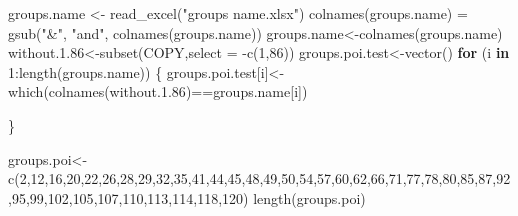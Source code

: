 \documentclass[
]{article}
\newenvironment{Shaded}{\begin{snugshade}}{\end{snugshade}}
\newcommand{\AttributeTok}[1]{\textcolor[rgb]{0.77,0.63,0.00}{#1}}
\newcommand{\ControlFlowTok}[1]{\textcolor[rgb]{0.13,0.29,0.53}{\textbf{#1}}}
\newcommand{\DecValTok}[1]{\textcolor[rgb]{0.00,0.00,0.81}{#1}}
\newcommand{\FloatTok}[1]{\textcolor[rgb]{0.00,0.00,0.81}{#1}}
\newcommand{\FunctionTok}[1]{\textcolor[rgb]{0.00,0.00,0.00}{#1}}
\newcommand{\NormalTok}[1]{#1}
\newcommand{\OtherTok}[1]{\textcolor[rgb]{0.56,0.35,0.01}{#1}}
\newcommand{\SpecialCharTok}[1]{\textcolor[rgb]{0.00,0.00,0.00}{#1}}
\newcommand{\StringTok}[1]{\textcolor[rgb]{0.31,0.60,0.02}{#1}}
\begin{document}
\begin{Shaded}
\begin{Highlighting}[]
\NormalTok{groups.name }\OtherTok{\textless{}{-}} \FunctionTok{read\_excel}\NormalTok{(}\StringTok{"groups name.xlsx"}\NormalTok{)}
\FunctionTok{colnames}\NormalTok{(groups.name) }\OtherTok{=} \FunctionTok{gsub}\NormalTok{(}\StringTok{"\&"}\NormalTok{, }\StringTok{"and"}\NormalTok{, }\FunctionTok{colnames}\NormalTok{(groups.name))}
\NormalTok{groups.name}\OtherTok{\textless{}{-}}\FunctionTok{colnames}\NormalTok{(groups.name)}
\NormalTok{without.}\FloatTok{1.86}\OtherTok{\textless{}{-}}\FunctionTok{subset}\NormalTok{(COPY,}\AttributeTok{select =} \SpecialCharTok{{-}}\FunctionTok{c}\NormalTok{(}\DecValTok{1}\NormalTok{,}\DecValTok{86}\NormalTok{))}
\NormalTok{groups.poi.test}\OtherTok{\textless{}{-}}\FunctionTok{vector}\NormalTok{()}
\ControlFlowTok{for}\NormalTok{ (i }\ControlFlowTok{in} \DecValTok{1}\SpecialCharTok{:}\FunctionTok{length}\NormalTok{(groups.name)) \{}
\NormalTok{  groups.poi.test[i]}\OtherTok{\textless{}{-}}\FunctionTok{which}\NormalTok{(}\FunctionTok{colnames}\NormalTok{(without.}\FloatTok{1.86}\NormalTok{)}\SpecialCharTok{==}\NormalTok{groups.name[i])}
  
\NormalTok{\}}

\NormalTok{groups.poi}\OtherTok{\textless{}{-}}\FunctionTok{c}\NormalTok{(}\DecValTok{2}\NormalTok{,}\DecValTok{12}\NormalTok{,}\DecValTok{16}\NormalTok{,}\DecValTok{20}\NormalTok{,}\DecValTok{22}\NormalTok{,}\DecValTok{26}\NormalTok{,}\DecValTok{28}\NormalTok{,}\DecValTok{29}\NormalTok{,}\DecValTok{32}\NormalTok{,}\DecValTok{35}\NormalTok{,}\DecValTok{41}\NormalTok{,}\DecValTok{44}\NormalTok{,}\DecValTok{45}\NormalTok{,}\DecValTok{48}\NormalTok{,}\DecValTok{49}\NormalTok{,}\DecValTok{50}\NormalTok{,}\DecValTok{54}\NormalTok{,}\DecValTok{57}\NormalTok{,}\DecValTok{60}\NormalTok{,}\DecValTok{62}\NormalTok{,}\DecValTok{66}\NormalTok{,}\DecValTok{71}\NormalTok{,}\DecValTok{77}\NormalTok{,}\DecValTok{78}\NormalTok{,}\DecValTok{80}\NormalTok{,}\DecValTok{85}\NormalTok{,}\DecValTok{87}\NormalTok{,}\DecValTok{92}\NormalTok{,}\DecValTok{95}\NormalTok{,}\DecValTok{99}\NormalTok{,}\DecValTok{102}\NormalTok{,}\DecValTok{105}\NormalTok{,}\DecValTok{107}\NormalTok{,}\DecValTok{110}\NormalTok{,}\DecValTok{113}\NormalTok{,}\DecValTok{114}\NormalTok{,}\DecValTok{118}\NormalTok{,}\DecValTok{120}\NormalTok{)}
\FunctionTok{length}\NormalTok{(groups.poi)}
\end{Highlighting}
\end{Shaded}
\end{document}
